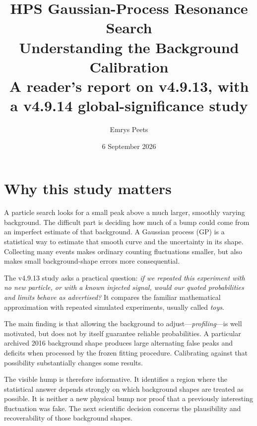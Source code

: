 \documentclass[11pt]{article}
\title{HPS Gaussian-Process Resonance Search\\Understanding the Background Calibration\\\large A reader's report on v4.9.13, with a v4.9.14 global-significance study}
\author{Emrys Peets}
\date{6 September 2026}
\begin{document}
\maketitle
\begin{center}
\end{center}

\section{Why this study matters}
A particle search looks for a small peak above a much larger, smoothly varying background. The difficult part is deciding how much of a bump could come from an imperfect estimate of that background. A Gaussian process (GP) is a statistical way to estimate that smooth curve and the uncertainty in its shape. Collecting many events makes ordinary counting fluctuations smaller, but also makes small background-shape errors more consequential.

The v4.9.13 study asks a practical question: \emph{if we repeated this experiment with no new particle, or with a known injected signal, would our quoted probabilities and limits behave as advertised?} It compares the familiar mathematical approximation with repeated simulated experiments, usually called \emph{toys}.

The main finding is that allowing the background to adjust---\emph{profiling}---is well motivated, but does not by itself guarantee reliable probabilities. A particular archived 2016 background shape produces large alternating false peaks and deficits when processed by the frozen fitting procedure. Calibrating against that possibility substantially changes some results.

The visible hump is therefore informative. It identifies a region where the statistical answer depends strongly on which background shapes are treated as possible. It is neither a new physical bump nor proof that a previously interesting fluctuation was fake. The next scientific decision concerns the plausibility and recoverability of those background shapes.
\end{document}
